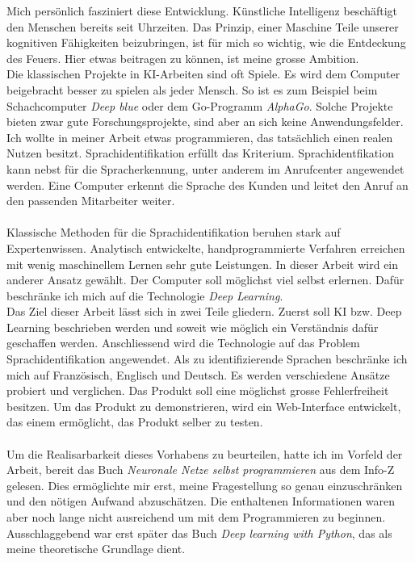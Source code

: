 Mich persönlich fasziniert diese Entwicklung. Künstliche Intelligenz beschäftigt den Menschen bereits seit Uhrzeiten. Das Prinzip, einer Maschine Teile unserer kognitiven Fähigkeiten beizubringen, ist für mich so wichtig, wie die Entdeckung des Feuers. Hier etwas beitragen zu können, ist meine grosse Ambition.
\\
Die klassischen Projekte in KI-Arbeiten sind oft Spiele. Es wird dem Computer beigebracht besser zu spielen als jeder Mensch. So ist es zum Beispiel beim Schachcomputer
\textit{Deep blue}\parencite{deepblue} oder dem Go-Programm \textit{AlphaGo}\parencite{alphago}.
Solche Projekte bieten zwar gute Forschungsprojekte, sind aber an sich keine Anwendungsfelder. Ich wollte in meiner Arbeit etwas programmieren, das tatsächlich einen realen Nutzen
besitzt.
Sprachidentifikation erfüllt das Kriterium. Sprachidentfikation kann nebst für die Spracherkennung, unter anderem im Anrufcenter angewendet werden. Eine Computer erkennt die Sprache des Kunden und leitet den Anruf an den passenden Mitarbeiter weiter.
\\ \\
Klassische Methoden für die Sprachidentifikation beruhen stark auf Expertenwissen. Analytisch entwickelte, handprogrammierte Verfahren erreichen mit  wenig maschinellem Lernen sehr gute Leistungen. In dieser Arbeit wird ein anderer Ansatz gewählt. Der Computer soll möglichst viel selbst erlernen. Dafür beschränke ich mich auf die Technologie \textit{Deep Learning}. 
\\ 
Das Ziel dieser Arbeit lässt sich in zwei Teile gliedern. Zuerst soll KI bzw. Deep Learning beschrieben werden und soweit wie möglich ein Verständnis dafür geschaffen werden.
Anschliessend wird die Technologie auf das Problem Sprachidentifikation angewendet. Als zu identifizierende Sprachen beschränke ich mich auf Französisch, Englisch und Deutsch. Es
werden verschiedene Ansätze probiert und verglichen. Das Produkt soll eine möglichst grosse Fehlerfreiheit besitzen. Um das Produkt zu demonstrieren, wird ein Web-Interface
entwickelt, das einem ermöglicht, das Produkt selber zu testen.
\\ \\
Um die Realisarbarkeit dieses Vorhabens zu beurteilen, hatte ich im Vorfeld der Arbeit, bereit das Buch  \textit{Neuronale Netze selbst programmieren}\parencite{neuronale_netze} aus dem Info-Z gelesen. Dies ermöglichte mir erst, meine Fragestellung so genau einzuschränken und den nötigen Aufwand abzuschätzen. Die enthaltenen Informationen waren aber noch lange nicht ausreichend um mit dem Programmieren zu beginnen. Ausschlaggebend war erst später das Buch \textit{Deep learning with Python}\parencite{chollet}, das als meine theoretische Grundlage dient. 
